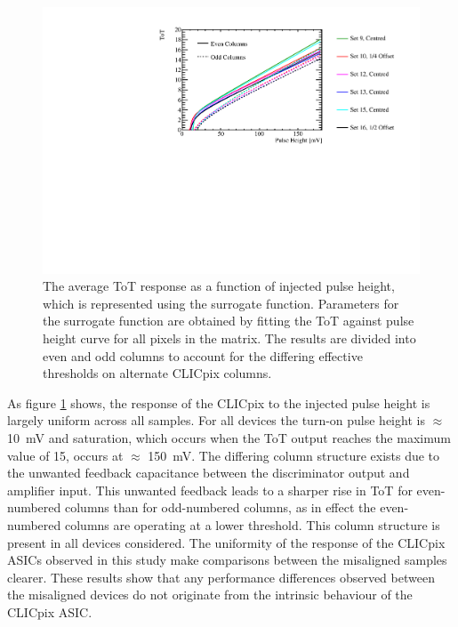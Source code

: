 \begin{figure}[h!]
\centering
\includegraphics[width=1.0\textwidth]{CLICdpVertex/Plots/TestPulseCalibration/FitParam/AverageToT_vs_InjectedPulseHeight.pdf}
\caption[The average ToT response as a function of injected pulse height, which is represented using the surrogate function.  Parameters for the surrogate function are obtained by fitting the ToT against pulse height curve for all pixels in the matrix.  The results are divided into even and odd columns to account for the differing effective thresholds on alternate CLICpix columns.]{The average ToT response as a function of injected pulse height, which is represented using the surrogate function.  Parameters for the surrogate function are obtained by fitting the ToT against pulse height curve for all pixels in the matrix.  The results are divided into even and odd columns to account for the differing effective thresholds on alternate CLICpix columns.}
\label{fig:testpulsemeanfit}
\end{figure}

As figure \ref{fig:testpulsemeanfit} shows, the response of the CLICpix to the injected pulse height is largely uniform across all samples.  For all devices the turn-on pulse height is $\approx$ 10~mV and saturation, which occurs when the ToT output reaches the maximum value of 15, occurs at $\approx$ 150~mV.  The differing column structure exists due to the unwanted feedback capacitance between the discriminator output and amplifier input.  This unwanted feedback leads to a sharper rise in ToT for even-numbered columns than for odd-numbered columns, as in effect the even-numbered columns are operating at a lower threshold.  This column structure is present in all devices considered.  The uniformity of the response of the CLICpix ASICs observed in this study make comparisons between the misaligned samples clearer.  These results show that any performance differences observed between the misaligned devices do not originate from the intrinsic behaviour of the CLICpix ASIC.   

